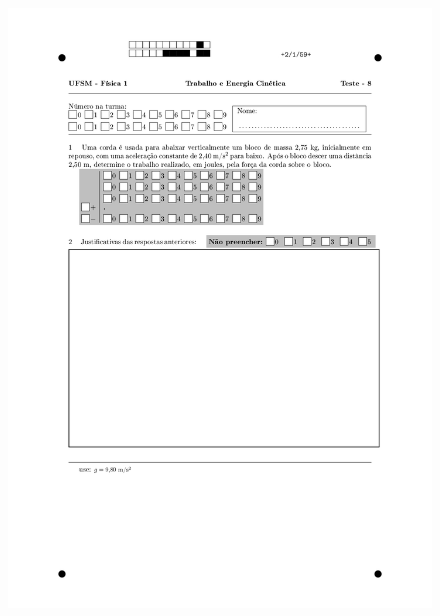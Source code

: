 \begin{figure}[H]\centering
\includegraphics[scale=0.7]{fig/orp1q7_page-0002.jpg}
\end{figure}
\vspace*{\fill}
